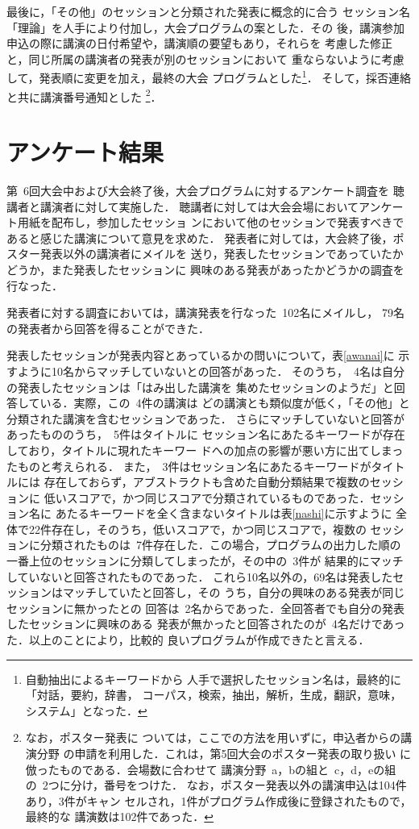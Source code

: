 最後に，「その他」のセッションと分類された発表に概念的に合う
セッション名「理論」を人手により付加し，大会プログラムの案とした．その
後，講演参加申込の際に講演の日付希望や，講演順の要望もあり，それらを
考慮した修正と，同じ所属の講演者の発表が別のセッションにおいて
重ならないように考慮して，発表順に変更を加え，最終の大会
プログラムとした\footnote{自動抽出によるキーワードから
人手で選択したセッション名は，最終的に「対話，要約，辞書，
コーパス，検索，抽出，解析，生成，翻訳，意味，システム」となった．}．
そして，採否連絡と共に講演番号通知とした
\footnote{なお，ポスター発表に
ついては，ここでの方法を用いずに，申込者からの講演分野
の申請を利用した．これは，第5回大会のポスター発表の取り扱い
に倣ったものである．会場数に合わせて
講演分野\ a，bの組と\ c，d，eの組の\ 2つに分け，番号をつけた．
なお，ポスター発表以外の講演申込は104件あり，3件がキャン
セルされ，1件がプログラム作成後に登録されたもので，最終的な
講演数は102件であった．}．

\section{アンケート結果} 
\label{haha}
第\ 6回大会中および大会終了後，大会プログラムに対するアンケート調査を
聴講者と講演者に対して実施した．
聴講者に対しては大会会場においてアンケート用紙を配布し，参加したセッショ
ンにおいて他のセッションで発表すべきであると感じた講演について意見を求めた．
発表者に対しては，大会終了後，ポスター発表以外の講演者にメイルを
送り，発表したセッションであっていたかどうか，また発表したセッションに
興味のある発表があったかどうかの調査を行なった．

発表者に対する調査においては，講演発表を行なった\ 102名にメイルし，
79名の発表者から回答を得ることができた．

発表したセッションが発表内容とあっているかの問いについて，表\ref{awanai}に
示すように10名からマッチしていないとの回答があった．
そのうち，\ 4名は自分の発表したセッションは「はみ出した講演を
集めたセッションのようだ」と回答している．実際，この\ 4件の講演は
どの講演とも類似度が低く，「その他」と分類された講演を含むセッションであった．
さらにマッチしていないと回答があったもののうち，\ 5件はタイトルに
セッション名にあたるキーワードが存在しており，タイトルに現れたキーワー
ドへの加点の影響が悪い方に出てしまったものと考えられる．
また，\ 3件はセッション名にあたるキーワードがタイトルには
存在しておらず，アブストラクトも含めた自動分類結果で複数のセッションに
低いスコアで，かつ同じスコアで分類されているものであった．セッション名に
あたるキーワードを全く含まないタイトルは表\ref{nashi}に示すように
全体で22件存在し，そのうち，低いスコアで，かつ同じスコアで，複数の
セッションに分類されたものは\ 7件存在した．この場合，プログラムの出力した順の
一番上位のセッションに分類してしまったが，その中の\ 3件が
結果的にマッチしていないと回答されたものであった．
これら10名以外の，69名は発表したセッションはマッチしていたと回答し，その
うち，自分の興味のある発表が同じセッションに無かったとの
回答は\ 2名からであった．全回答者でも自分の発表したセッションに興味のある
発表が無かったと回答されたのが\ 4名だけであった．以上のことにより，比較的
良いプログラムが作成できたと言える．


